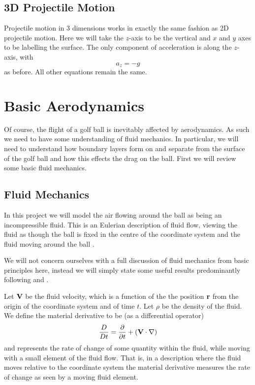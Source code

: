 \subsection{3D Projectile Motion}

Projectile motion in 3 dimensions works in exactly the same fashion as 2D projectile motion. Here we
will take the $z$-axis to be the vertical and $x$ and $y$ axes to be labelling the surface. The only
component of acceleration is along the $z$-axis, with
\[
a_z = -g
\]
as before. All other equations remain the same.

\section{Basic Aerodynamics}

Of course, the flight of a golf ball is inevitably affected by aerodynamics. As such we need to have
some understanding of fluid mechanics. In particular, we will need to understand how boundary layers
form on and separate from the surface of the golf ball and how this effects the drag on the ball.
First we will review some basic fluid mechanics.

\subsection{Fluid Mechanics}

In this project we will model the air flowing around the ball as being an incompressible fluid. This
is an Eulerian description of fluid flow, viewing the fluid as though the ball is fixed in the centre
of the coordinate system and the fluid moving around the ball \citet{Ruban2014}.

We will not concern ourselves with a full discussion of fluid mechanics from basic principles here, 
instead we will simply state some useful results predominantly following \citet{Ruban2014} and 
\citet{sears}.

Let $\mathbf{V}$ be the fluid velocity, which is a function of the the position $\mathbf{r}$ from the origin of the
coordinate system and of time $t$. Let $\rho$ be the density of the fluid. We define the material 
derivative to be (as a differential operator)
\begin{equation} \nonumber
\frac{D}{Dt} = \frac{\partial}{\partial t} + (\mathbf{V} \cdot \nabla)
\end{equation}
and represents the rate of change of some quantity within the fluid, while moving with a small element
of the fluid flow. That is, in a description where the fluid moves relative to the coordinate system
the material derivative measures the rate of change as seen by a moving fluid element.

